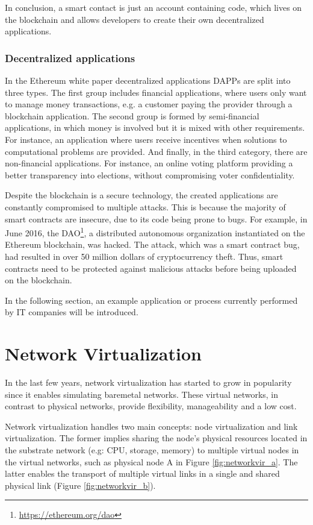 In conclusion, a smart contact is just an account containing code, which lives on the blockchain and allows developers to create their own decentralized applications. 

\subsubsection{Decentralized applications}

In the Ethereum white paper \cite{buterin2014next} decentralized applications DAPPs are split into three types. The first group includes financial applications, where users only want to manage money transactions, e.g. a customer paying the provider through a blockchain application. The second group is formed by semi-financial applications, in which money is involved but it is mixed with other requirements. For instance, an application where users receive incentives when solutions to computational problems are provided. And finally, in the third category, there are non-financial applications. For instance, an online voting platform providing a better transparency into elections, without compromising voter confidentiality.

Despite the blockchain is a secure technology, the created applications are constantly compromised to multiple attacks. This is because the majority of smart contracts are insecure, due to its code being prone to bugs.
For example, in June 2016, the DAO\footnote{\url{https://ethereum.org/dao}}, a distributed autonomous organization instantiated on the Ethereum blockchain, was hacked. The attack, which was a smart contract bug, had resulted in over 50 million dollars of cryptocurrency theft. Thus, smart contracts need to be protected against malicious attacks before being uploaded on the blockchain.

In the following section, an example application or process currently performed by IT companies will be introduced.


\section{Network Virtualization} \label{networkvirtualization}

In the last few years, network virtualization has started to grow in popularity since it enables simulating baremetal networks. These virtual networks, in contrast to physical networks, provide flexibility, manageability and a low cost. 

Network virtualization handles two main concepts: node virtualization and link virtualization. The former implies sharing the node's physical resources located in the substrate network (e.g: CPU, storage, memory) to multiple virtual nodes in the virtual networks, such as physical node A in Figure \ref{fig:networkvir_a}. The latter enables the transport of multiple virtual links in a single and shared physical link (Figure \ref{fig:networkvir_b}).

